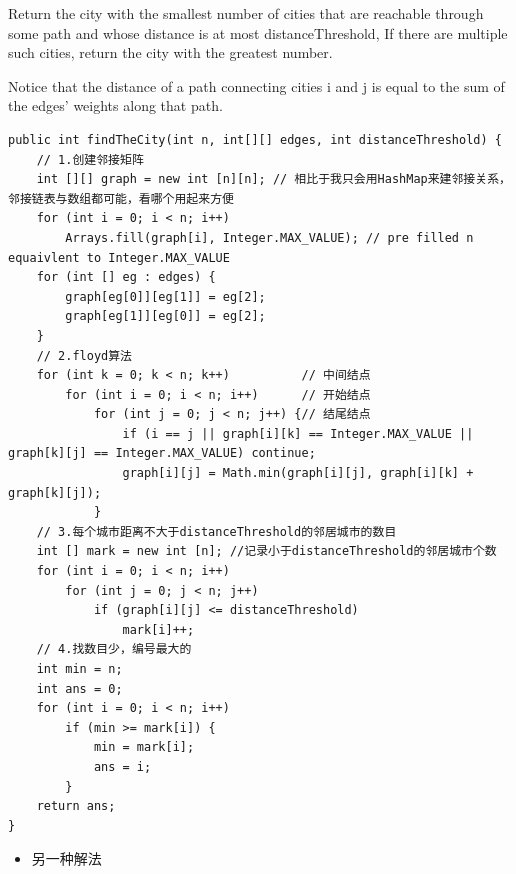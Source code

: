 \documentclass[9pt, b5paaper]{book}
\begin{document}
Return the city with the smallest number of cities that are reachable through some path and whose distance is at most distanceThreshold, If there are multiple such cities, return the city with the greatest number.

Notice that the distance of a path connecting cities i and j is equal to the sum of the edges' weights along that path.
\begin{verbatim}
public int findTheCity(int n, int[][] edges, int distanceThreshold) {
    // 1.创建邻接矩阵
    int [][] graph = new int [n][n]; // 相比于我只会用HashMap来建邻接关系，邻接链表与数组都可能，看哪个用起来方便
    for (int i = 0; i < n; i++)
        Arrays.fill(graph[i], Integer.MAX_VALUE); // pre filled n equaivlent to Integer.MAX_VALUE
    for (int [] eg : edges) {
        graph[eg[0]][eg[1]] = eg[2];
        graph[eg[1]][eg[0]] = eg[2];
    }
    // 2.floyd算法
    for (int k = 0; k < n; k++)          // 中间结点
        for (int i = 0; i < n; i++)      // 开始结点
            for (int j = 0; j < n; j++) {// 结尾结点
                if (i == j || graph[i][k] == Integer.MAX_VALUE || graph[k][j] == Integer.MAX_VALUE) continue;
                graph[i][j] = Math.min(graph[i][j], graph[i][k] + graph[k][j]);
            }                
    // 3.每个城市距离不大于distanceThreshold的邻居城市的数目
    int [] mark = new int [n]; //记录小于distanceThreshold的邻居城市个数
    for (int i = 0; i < n; i++) 
        for (int j = 0; j < n; j++) 
            if (graph[i][j] <= distanceThreshold)
                mark[i]++;
    // 4.找数目少，编号最大的
    int min = n;
    int ans = 0;
    for (int i = 0; i < n; i++) 
        if (min >= mark[i]) {
            min = mark[i];
            ans = i;
        }
    return ans;
}
\end{verbatim}
\begin{itemize}
\item 另一种解法
\end{itemize}
\end{document}

